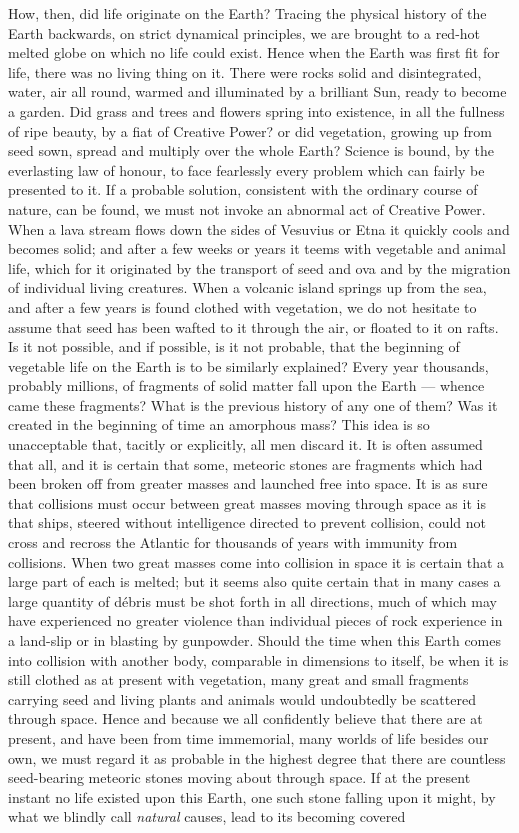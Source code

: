 \documentclass[a4paper, 11pt, oneside, english]{article}
\begin{document}
How, then, did life originate on the Earth? Tracing the physical history of the Earth backwards, on strict dynamical principles, we are brought to a red-hot melted globe on which no life could exist. Hence when the Earth was first fit for life, there was no living thing on it. There were rocks solid and disintegrated, water, air all round, warmed and illuminated by a brilliant Sun, ready to become a garden. Did grass and trees and flowers spring into existence, in all the fullness of ripe beauty, by a fiat of Creative Power? or did vegetation, growing up from seed sown, spread and multiply over the whole Earth? Science is bound, by the everlasting law of honour, to face fearlessly every problem which can fairly be presented to it. If a probable solution, consistent with the ordinary course of nature, can be found, we must not invoke an abnormal act of Creative Power. When a lava stream flows down the sides of Vesuvius or Etna it quickly cools and becomes solid; and after a few weeks or years it teems with vegetable and animal life, which for it originated by the transport of seed and ova and by the migration of individual living creatures. When a volcanic island springs up from the sea, and after a few years is found clothed with vegetation, we do not hesitate to assume that seed has been wafted to it through the air, or floated to it on rafts. Is it not possible, and if possible, is it not probable, that the beginning of vegetable life on the Earth is to be similarly explained? Every year thousands, probably millions, of fragments of solid matter fall upon the Earth --- whence came these fragments? What is the previous history of any one of them? Was it created in the beginning of time an amorphous mass? This idea is so unacceptable that, tacitly or explicitly, all men discard it. It is often assumed that all, and it is certain that some, meteoric stones are fragments which had been broken off from greater masses and launched free into space. It is as sure that collisions must occur between great masses moving through space as it is that ships, steered without intelligence directed to prevent collision, could not cross and recross the Atlantic for thousands of years with immunity from collisions. When two great masses come into collision in space it is certain that a large part of each is melted; but it seems also quite certain that in many cases a large quantity of débris must be shot forth in all directions, much of which may have experienced no greater violence than individual pieces of rock experience in a land-slip or in blasting by gunpowder. Should the time when this Earth comes into collision with another body, comparable in dimensions to itself, be when it is still clothed as at present with vegetation, many great and small fragments carrying seed and living plants and animals would undoubtedly be scattered through space. Hence and because we all confidently believe that there are at present, and have been from time immemorial, many worlds of life besides our own, we must regard it as probable in the highest degree that there are countless seed-bearing meteoric stones moving about through space. If at the present instant no life existed upon this Earth, one such stone falling upon it might, by what we blindly call \emph{natural} causes, lead to its becoming covered 
\end{document}

